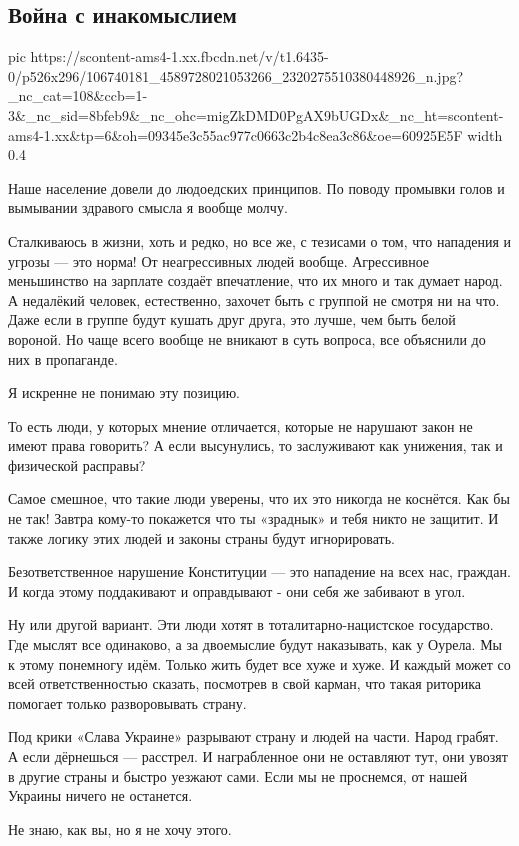  
 
 
 
 

\subsection{Война с инакомыслием}


\ifcmt
  pic https://scontent-ams4-1.xx.fbcdn.net/v/t1.6435-0/p526x296/106740181_4589728021053266_2320275510380448926_n.jpg?_nc_cat=108&ccb=1-3&_nc_sid=8bfeb9&_nc_ohc=migZkDMD0PgAX9bUGDx&_nc_ht=scontent-ams4-1.xx&tp=6&oh=09345e3c55ac977c0663c2b4c8ea3c86&oe=60925E5F
  width 0.4
\fi


Наше население довели до людоедских принципов. По поводу промывки голов и вымывании здравого смысла я вообще молчу. 

Сталкиваюсь в жизни, хоть и редко, но все же,  с тезисами о том, что нападения
и угрозы — это норма! От неагрессивных людей вообще. Агрессивное меньшинство на
зарплате создаёт впечатление, что их много и так думает народ. А недалёкий
человек, естественно, захочет быть с группой не смотря ни на что. Даже если в
группе будут кушать друг друга, это лучше, чем быть белой вороной. Но чаще
всего вообще не вникают в суть вопроса, все объяснили до них в пропаганде. 

Я искренне не понимаю эту позицию. 

То есть люди, у которых мнение отличается, которые не нарушают закон не имеют
права говорить? А если высунулись, то заслуживают как унижения, так и
физической расправы? 

Самое смешное, что такие люди уверены, что их это никогда не коснётся. Как бы
не так! Завтра кому-то покажется что ты «зраднык» и тебя никто не защитит. И
также логику этих людей и законы страны будут игнорировать. 

Безответственное нарушение Конституции — это нападение на всех нас, граждан. И
когда этому поддакивают и оправдывают -  они себя же забивают в угол. 

Ну или другой вариант. Эти люди хотят в тоталитарно-нацистское государство. Где
мыслят все одинаково, а за двоемыслие  будут наказывать, как у Оурела. Мы к
этому понемногу идём. Только жить будет все хуже и хуже. И каждый может со всей
ответственностью сказать, посмотрев в свой карман, что такая риторика помогает
только разворовывать страну. 

Под крики «Слава Украине» разрывают страну и людей на части. Народ грабят. А
если дёрнешься — расстрел. И награбленное они не оставляют тут, они увозят в
другие страны и быстро уезжают сами. Если мы не проснемся, от нашей Украины
ничего не останется. 

Не знаю, как вы, но я не хочу этого.
